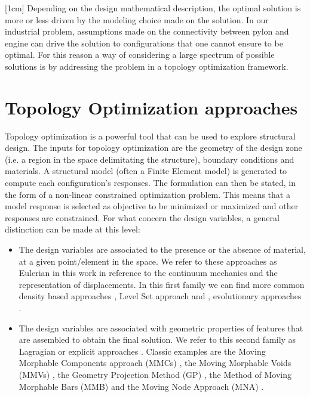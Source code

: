  [1cm] Depending on the design mathematical description, the optimal solution is more or less driven by the modeling choice made on the solution. In our industrial problem, assumptions made on the connectivity between pylon and engine can drive the solution to configurations that one cannot ensure to be optimal.  For this reason a way of considering a large spectrum of possible solutions is by addressing the problem in a topology optimization framework. 
\section*{Topology Optimization approaches}
 Topology optimization is a powerful tool that can be used to explore structural design. The inputs for topology optimization are the geometry of the design zone (i.e. a region in the space delimitating the structure), boundary conditions and materials. A structural model (often a Finite Element model) is generated to compute each configuration's responses. 
The formulation can then be stated, in the form of a non-linear constrained optimization problem. This means that a model response is selected as objective to be minimized or maximized and other responses are constrained.
For what concern the design variables, a general distinction can be made at this level:
\begin{itemize}
\item The design variables are associated to the presence or the absence of material, at a given point/element in the space. We refer to these approaches as Eulerian in this work \cite{zhang2016lagrangian} in reference to the continuum mechanics and the representation of displacements. In this first family we can find more common density based approaches \cite{bendsoe1989optimal,zhou1991coc,bendsoe1995optimization},  Level Set approach \cite{wang2003level,allaire2004structural} and ,  evolutionary approaches \cite{xie1993simple,xia2018bi}. 
\item The design variables are associated with geometric properties of features that are assembled to obtain the final solution. We refer to this second family as Lagragian or explicit approaches \cite{zhang2016lagrangian}. Classic examples are the Moving Morphable Components approach (MMCs) \cite{guo2014doing,guo2016explicit,zhang2016new,zhang2017new}, the Moving Morphable Voids (MMVs) \cite{zhang2017explicit}, the Geometry Projection Method (GP) \cite{bell2012geometry,norato2015geometryde,zhang2016geometry}, the Method of Moving Morphable
Bars (MMB) \cite{hoang2017topology} and  the Moving Node Approach (MNA) \cite{overvelde2012moving}. 
\end{itemize}

